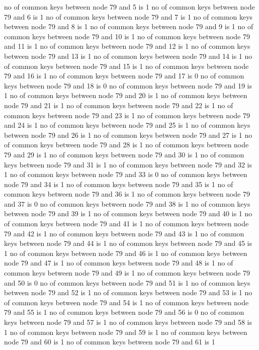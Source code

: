 no of common keys between node 79 and 5 is 1
no of common keys between node 79 and 6 is 1
no of common keys between node 79 and 7 is 1
no of common keys between node 79 and 8 is 1
no of common keys between node 79 and 9 is 1
no of common keys between node 79 and 10 is 1
no of common keys between node 79 and 11 is 1
no of common keys between node 79 and 12 is 1
no of common keys between node 79 and 13 is 1
no of common keys between node 79 and 14 is 1
no of common keys between node 79 and 15 is 1
no of common keys between node 79 and 16 is 1
no of common keys between node 79 and 17 is 0
no of common keys between node 79 and 18 is 0
no of common keys between node 79 and 19 is 1
no of common keys between node 79 and 20 is 1
no of common keys between node 79 and 21 is 1
no of common keys between node 79 and 22 is 1
no of common keys between node 79 and 23 is 1
no of common keys between node 79 and 24 is 1
no of common keys between node 79 and 25 is 1
no of common keys between node 79 and 26 is 1
no of common keys between node 79 and 27 is 1
no of common keys between node 79 and 28 is 1
no of common keys between node 79 and 29 is 1
no of common keys between node 79 and 30 is 1
no of common keys between node 79 and 31 is 1
no of common keys between node 79 and 32 is 1
no of common keys between node 79 and 33 is 0
no of common keys between node 79 and 34 is 1
no of common keys between node 79 and 35 is 1
no of common keys between node 79 and 36 is 1
no of common keys between node 79 and 37 is 0
no of common keys between node 79 and 38 is 1
no of common keys between node 79 and 39 is 1
no of common keys between node 79 and 40 is 1
no of common keys between node 79 and 41 is 1
no of common keys between node 79 and 42 is 1
no of common keys between node 79 and 43 is 1
no of common keys between node 79 and 44 is 1
no of common keys between node 79 and 45 is 1
no of common keys between node 79 and 46 is 1
no of common keys between node 79 and 47 is 1
no of common keys between node 79 and 48 is 1
no of common keys between node 79 and 49 is 1
no of common keys between node 79 and 50 is 0
no of common keys between node 79 and 51 is 1
no of common keys between node 79 and 52 is 1
no of common keys between node 79 and 53 is 1
no of common keys between node 79 and 54 is 1
no of common keys between node 79 and 55 is 1
no of common keys between node 79 and 56 is 0
no of common keys between node 79 and 57 is 1
no of common keys between node 79 and 58 is 1
no of common keys between node 79 and 59 is 1
no of common keys between node 79 and 60 is 1
no of common keys between node 79 and 61 is 1
